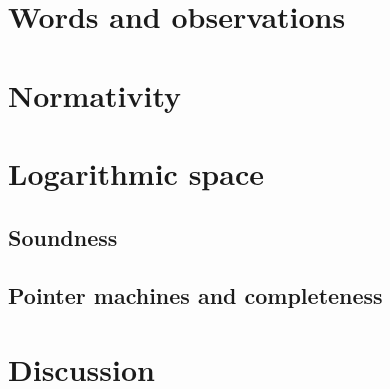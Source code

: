 \section{Words and observations}\label{sec:words}
	
	
	
\section{Normativity}\label{sec:normativity}
	

\section{Logarithmic space}\label{sec:logspace}
	\subsection{Soundness}
	
	\subsection{Pointer machines and completeness}
	

\section{Discussion}




\thispagestyle{empty}
